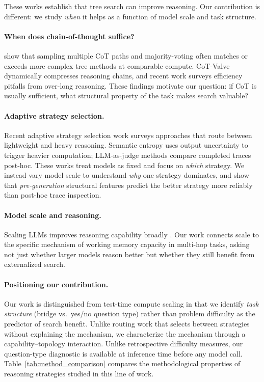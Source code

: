 \documentclass{article}
\begin{document}
These works establish that tree search can improve reasoning. Our contribution is different: we study \emph{when} it helps as a function of model scale and task structure.

\paragraph{When does chain-of-thought suffice?}
\citet{wang2023selfconsistencyimproveschainthought} show that sampling multiple CoT paths and majority-voting often matches or exceeds more complex tree methods at comparable compute. CoT-Valve \citep{ma2025cotvalvelengthcompressiblechainofthoughttuning} dynamically compresses reasoning chains, and recent work \citep{sui2025stopoverthinkingsurveyefficient} surveys efficiency pitfalls from over-long reasoning. These findings motivate our question: if CoT is usually sufficient, what structural property of the task makes search valuable?

\paragraph{Adaptive strategy selection.}
Recent adaptive strategy selection work \citep{sui2025stopoverthinkingsurveyefficient} surveys approaches that route between lightweight and heavy reasoning. Semantic entropy \citep{kossen2024semanticentropyprobesrobust} uses output uncertainty to trigger heavier computation; LLM-as-judge methods \citep{zheng2023judgingllmasajudgemtbenchchatbot} compare completed traces post-hoc. These works treat models as fixed and focus on \emph{which} strategy. We instead vary model scale to understand \emph{why} one strategy dominates, and show that \emph{pre-generation} structural features predict the better strategy more reliably than post-hoc trace inspection.

\paragraph{Model scale and reasoning.}
Scaling LLMs improves reasoning capability broadly \citep{wei2023chainofthoughtpromptingelicitsreasoning}. Our work connects scale to the specific mechanism of working memory capacity in multi-hop tasks, asking not just whether larger models reason better but whether they still benefit from externalized search.

\paragraph{Positioning our contribution.}
Our work is distinguished from test-time compute scaling \citep{snell2024scalingllmtesttimecompute} in that we identify \emph{task structure} (bridge vs.\ yes/no question type) rather than problem difficulty as the predictor of search benefit. Unlike routing work that selects between strategies without explaining the mechanism, we characterize the mechanism through a capability--topology interaction. Unlike retrospective difficulty measures, our question-type diagnostic is available at inference time before any model call. Table~\ref{tab:method_comparison} compares the methodological properties of reasoning strategies studied in this line of work.
\end{document}
